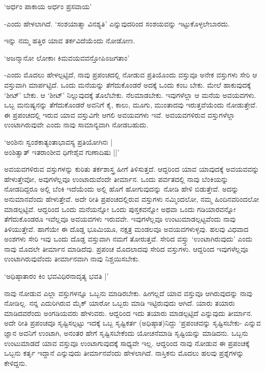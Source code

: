 \begin{shloka}
`ಅರ್ಧಂ ಪಾಕಾಯ ಅರ್ಧಂ ಪ್ರಸವಾಯ'
\end{shloka}

-ಎಂದು ಹೇಳಲಾಗಿದೆ. `ಸಂಶಯಾತ್ಮಾ ವಿನಶ್ಯತಿ' ಎನ್ನುವುದರಿಂದ ಸಂಶಯವನ್ನು ಇಟ್ಟುಕೊಳ್ಳಲೇಬಾರದು.

ಇನ್ನು ನಮ್ಮ ಹತ್ತಿರ ಯಾವ ತರ್ಕವಿದೆಯೆಂದು ನೋಡೋಣ.

\begin{shloka}
`ಅಜನ್ಮಾನೋ ಲೋಕಾಃ ಕಿಮವಯವವನ್ತೋಪಿಽಜಗತಾಂ'
\end{shloka}

-ಎಂದು ಮೊದಲು ಹೇಳಲ್ಪಟ್ಟಿದೆ, ನಾವು ಪ್ರಪಂಚದಲ್ಲಿ ನೋಡುವ ಪ್ರತಿಯೊಂದು ವಸ್ತುವೂ ಅನೇಕ ವಸ್ತುಗಳು ಸೇರಿ ಆ ವಸ್ತುವಾಗಿ ಮಾರ್ಪಟ್ಟಿದೆ. ಒಂದು ಮನೆಯನ್ನು ತೆಗೆದುಕೊಂಡರೆ ಅದಕ್ಕೆ ಒಂದು ಕಂಬ ಬೇಕು. ಮೇಲೆ ಹಾಕುವುದಕ್ಕೆ `ಶೀಟ್' ಬೇಕು. ಆ `ಶೀಟ್' ನಿಲ್ಲುವುದಕ್ಕೆ ತೊಲೆಬೇಕು. ನೆಲಮಾಡಬೇಕು. ಇವುಗಳೆಲ್ಲಾ ಆ ಮನೆಯ ಅವಯವಗಳು. ಒಬ್ಬ ಮನುಷ್ಯನನ್ನು ತೆಗೆದುಕೊಂಡರೆ ಅವನಿಗೆ ಕೈ, ಕಾಲು, ಮೂಗು, ಮುಂತಾದವು ಇರುತ್ತವೆಯೆಂದು ನೋಡುತ್ತೇವೆ. ಈ ಪ್ರಪಂಚದಲ್ಲಿ ಇರುವ ಯಾವ ವಸ್ತುವಿಗೇ ಆಗಲಿ ಅವಯವಗಳು ಇವೆ. ಅವಯವಗಳಿರುವ ವಸ್ತುಗಳೆಲ್ಲಾ ಉಂಟಾಗಿರುವುವೇ ಎಂದು ನಾವು ಸಾಮಾನ್ಯವಾಗಿ ನೋಡಬಹುದು.

\begin{shloka}
`ಅಂಶಿನಃ ಸ್ವಂಶಕಾತ್ಯಂತಾಭಾವಸ್ಯ ಪ್ರತಿಯೋಗಿನಃ |\\
ಅಂಶಿತ್ವಾತ್ ಇತರಾಂಶೀವ ಧಿಗೇಶೈವ ಗುಣಾದಿಷು ||'
\end{shloka}

ಅವಯವಗಳಿರುವ ವಸ್ತುಗಳನ್ನು ಕುರಿತು ತರ್ಕಶಾಸ್ತ್ರ ಹೀಗೆ ತಿಳಿಸುತ್ತದೆ. ಆದ್ದರಿಂದ ಯಾವ ಯಾವುದಕ್ಕೆ ಅವಯವವನ್ನು ಹೇಳುತ್ತೇವೋ, ಅವುಗಳೆಲ್ಲವೂ ಉಂಟಾದುವೆಂದೇ ತೀರ್ಮಾನ. ಒಂದು ಪರ್ವತದಲ್ಲಿ ನಾವು ಬೆಂಕಿಯನ್ನು ನೋಡದಿದ್ದರೂ ಅಲ್ಲಿ ಬೆಂಕಿ ಇದೆಯೆಂದು ಅಲ್ಲಿ ಹೊಗೆ ಹೋಗುವುದನ್ನು ನೋಡಿ ಹೇಳಿ ಬಿಡುತ್ತೇವೆ. ಅದನ್ನು ಅನುಮಾನವೆಂದು ಹೇಳುತ್ತೇವೆ. ಅದೇ ರೀತಿ ಪ್ರಪಂಚದಲ್ಲಿರುವ ವಸ್ತುಗಳು ನಮ್ಮಿಂದಲೋ, ನಮ್ಮ ಹಿಂದಿನವರಿಂದಲೋ ಮಾಡಲ್ಪಟ್ಟಿವೆ. ಆದ್ದರಿಂದ ಒಂದು ಮನೆಯನ್ನೋ ಒಂದು ಪುಸ್ತಕವನ್ನೋ ಅಥವಾ ಒಂದು ಗಡಿಯಾರವನ್ನೋ ತೆಗೆದುಕೊಂಡರೂ ಇವೆಲ್ಲವೂ ಅವಯವಗಳು ಇರುವವೇ. ಇವುಗಳೆಲ್ಲವೂ ಉಂಟುಮಾಡಲ್ಪಟ್ಟವೆಂದು ನಾವು ತಿಳಿಯುತ್ತೇವೆ. ಹಾಗೆಯೇ ಈ ದೊಡ್ಡ ಭೂಮಿಯೂ, ನಕ್ಷತ್ರ ಮಂಡಲವೂ ಅವಯವಗಳುಳ್ಳವು. ಹಲವು ವಿಧವಾದ ಅಂಶಗಳು ಸೇರಿ ಇವು ಒಂದು ದೊಡ್ಡ ವಸ್ತುವಾಗಿ ನಮಗೆ ತೋರುತ್ತವೆ. ಸೇರಿದ ವಸ್ತ್ತು `ಉಂಟಾಗಿರುವುದು' ಎಂದು ನಾವು ಮೊದಲೇ ತೀರ್ಮಾನ ಮಾಡಿದೆವು. ಪ್ರಪಂಚ ಮೊದಲಾದವು ಸೇರಿದ ವಸ್ತುಗಳು. ಆದ್ದರಿಂದ ಇವುಗಳೆಲ್ಲವೂ ಉಂಟಾಗಿರುವುವೆಂದು ತೀರ್ಮಾನವಾಗಿ ನಾವು ನಿಶ್ಚಯಿಸಬೇಕು.

\begin{shloka}
`ಅಧಿಷ್ಠಾತಾರಂ ಕಿಂ ಭವವಿಧಿರನಾದೃತ್ಯ ಭವತಿ |'
\end{shloka}

ನಾವು ನೋಡುವ ಎಲ್ಲಾ ವಸ್ತುಗಳನ್ನೂ ಒಬ್ಬನು ಮಾಡಿರಬೇಕು. ಹೀಗಲ್ಲದೆ ಯಾವ ವಸ್ತುವೂ ಆಗಿರುವುದನ್ನು ನಾವು ನೋಡಿಲ್ಲ. ನನ್ನ ಎದುರಿಗಿರುವ ಮೈಕ್ ಯಾರೋ ಒಬ್ಬರು ಮಾಡಿ ಇಟ್ಟಿರುವುದು ಆಗಿದೆ. ಯಾರು ತಯಾರು ಮಾಡಿದವರೆಂದು ಅಂಗಡಿಯವರು ಹೇಳುವರು. ಆದ್ದರಿಂದ ಇದು ತಯಾರು ಮಾಡಲ್ಪಟ್ಟಿದೆ ಎನ್ನುವುದು ತೀರ್ಮಾನ. ಅದೇ ರೀತಿ ಪ್ರಪಂಚವೂ ಸೃಷ್ಟಿಸಲ್ಪಟ್ಟು ಇದಕ್ಕೆ ಒಬ್ಬ ಸೃಷ್ಟಿಕರ್ತ (ಅಧಿಷ್ಠಾತ)ನಿದ್ದು `ಪ್ರಪಂಚವನ್ನು ಸೃಷ್ಟಿಸಬೇಕು- ಎನ್ನುವ ಜ್ಞಾನ ಅವನಿಗೆ ಉಂಟಾಗಿ, ಅನಂತರ ಹೇಗೆ ಸೃಷ್ಟಿಸಬೇಕೆಂದು ಯೋಚನೆಮಾಡಿ ಸೃಷ್ಟಿಯನ್ನು ಮಾಡಿದನು. ಒಬ್ಬನು ಉಂಟುಮಾಡದೆ ಯಾವ ವಸ್ತುವೂ ಉಂಟಾಗುವುದಕ್ಕೆ ಸಾಧ್ಯವೇ ಇಲ್ಲ. ಆದ್ದರಿಂದ ನಾವು ನೋಡುವ ಈ ಪ್ರಪಂಚಕ್ಕೆ ಒಬ್ಬನು ಕರ್ತೃ ಇದ್ದಾನೆ ಎನ್ನುವುದು ತೀರ್ಮಾನವೆಂದು ಹೇಳಲಾಗಿದೆ. ನಾಸ್ತಿಕನು ಮೊದಲು ಹಲವು ಪ್ರಶ್ನೆಗಳನ್ನು ಕೇಳಿದ್ದನು.

